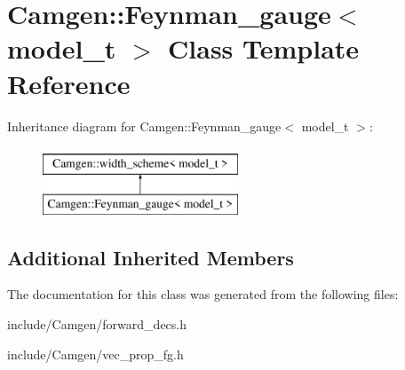 \hypertarget{a00221}{\section{Camgen\-:\-:Feynman\-\_\-gauge$<$ model\-\_\-t $>$ Class Template Reference}
\label{a00221}
}
Inheritance diagram for Camgen\-:\-:Feynman\-\_\-gauge$<$ model\-\_\-t $>$\-:\begin{figure}[H]
\begin{center}
\leavevmode
\includegraphics[height=2.000000cm]{a00221}
\end{center}
\end{figure}
\subsection*{Additional Inherited Members}


The documentation for this class was generated from the following files\-:\begin{DoxyCompactItemize}
\item 
include/\-Camgen/forward\-\_\-decs.\-h\item 
include/\-Camgen/vec\-\_\-prop\-\_\-fg.\-h\end{DoxyCompactItemize}
